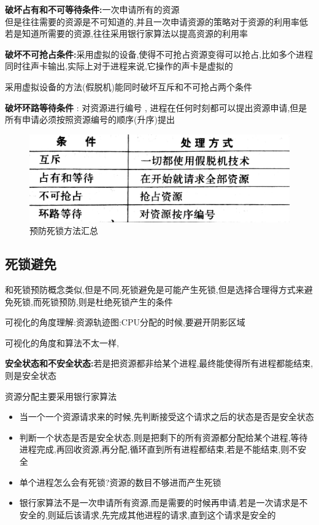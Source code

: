 \documentclass[UTF8,a4paper]{ctexart}
\begin{document}
\textbf{破坏占有和不可等待条件:}一次申请所有的资源\\
但是往往需要的资源是不可知道的,并且一次申请资源的策略对于资源的利用率低\\
若是知道所需要的资源,往往采用银行家算法以提高资源的利用率

\textbf{破坏不可抢占条件:}采用虚拟的设备,使得不可抢占资源变得可以抢占,比如多个进程同时往声卡输出,实际上对于进程来说,它操作的声卡是虚拟的

采用虚拟设备的方法(假脱机)能同时破坏互斥和不可抢占两个条件

\textbf{破坏环路等待条件} : 对资源进行编号 , 进程在任何时刻都可以提出资源申请,但是所有申请必须按照资源编号的顺序(升序)提出

\begin{figure}[H]
	\centering
	\includegraphics[scale = 0.1]{assets/ModernOperatingSystems_d2112.png}
	\caption{预防死锁方法汇总}
\end{figure}

\subsection{死锁避免}
和死锁预防概念类似,但是不同,死锁避免是可能产生死锁,但是选择合理得方式来避免死锁,而死锁预防,则是杜绝死锁产生的条件

可视化的角度理解:资源轨迹图:CPU分配的时候,要避开阴影区域

可视化的角度和算法不太一样,

\textbf{安全状态和不安全状态:}若是把资源都非给某个进程,最终能使得所有进程都能结束,则是安全状态

资源分配主要采用银行家算法

\begin{itemize}
	\item 当一个一个资源请求来的时候,先判断接受这个请求之后的状态是否是安全状态
	\item 判断一个状态是否是安全状态,则是把剩下的所有资源都分配给某个进程,等待进程完成,再回收资源,再分配,循环直到所有进程都结束,若是不能结束,则不安全
	\item 单个进程怎么会有死锁?资源的数目不够进而产生死锁
	\item 银行家算法不是一次申请所有资源,而是需要的时候再申请,若是一次请求是不安全的,则延后该请求,先完成其他进程的请求,直到这个请求是安全的
\end{itemize}
\end{document}

